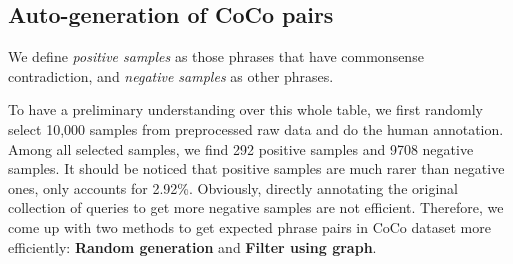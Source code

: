 \subsection{Auto-generation of CoCo pairs}
We define \textit{positive samples} as those phrases that have commonsense contradiction, and \textit{negative samples} as other phrases. 

To have a preliminary understanding over this whole table, we first randomly select 10,000 samples from preprocessed raw data and do the human annotation. 
Among all selected samples, we find 292 positive samples and 9708 negative samples. It should be noticed that positive samples are much rarer than negative ones, only accounts for 2.92\%. Obviously, directly annotating the original collection of queries to get more negative samples are not efficient.
Therefore, we come up with two methods to get expected phrase pairs in CoCo dataset more efficiently: \textbf{Random generation} and \textbf{Filter using graph}. 


